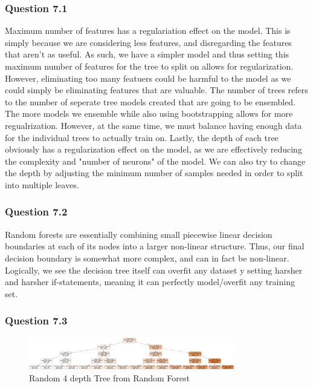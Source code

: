 \documentclass[11pt,letterpaper]{article}
\begin{document}
\subsubsection*{Question 7.1}
Maximum number of features has a regulariation effect on the model. This is simply because we are considering less 
features, and disregarding the features that aren't as useful. As such, we have a simpler model and thus 
setting this maximum number of features for the tree to split on allows for regularization. However, eliminating
too many featuers could be harmful to the model as we could simply be eliminating features that are valuable.
The number of trees refers to the number of seperate tree models created that are going to be ensembled. The more models
we ensemble while
also using bootstrapping allows for more regualrization. However, at the same time, we must balance having enough data 
for the individual trees to actually train on. Lastly, the depth of each tree obviously has a regularization effect 
on the model, as we are effectively reducing the complexity and "number of neurons" of the model. We can also try 
to change the depth by adjusting the minimum number of samples needed in order to split into multiple leaves. 

\subsubsection*{Question 7.2}
Random forests are essentially combining small piecewise linear decision boundaries 
at each of its nodes into a larger non-linear structure. Thus, our final decision 
boundary is somewhat more complex, and can in fact be non-linear. Logically, we see
the decision tree itself can overfit any dataset y setting harsher and harsher if-statements,
meaning it can perfectly model/overfit any training set. 
\subsubsection*{Question 7.3}

\begin{figure}[H]
    \centering
        \includegraphics[width=0.8\textwidth]{../Figures/tree.png}
    \hfill
       \caption{Random 4 depth Tree from Random Forest}
       \label{fig:boxPlots}
\end{figure}
\end{document}
